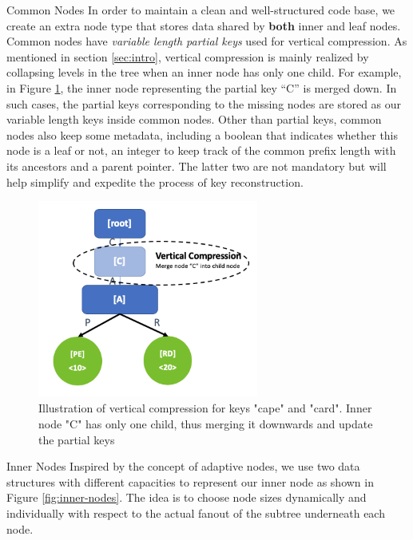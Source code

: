 \documentclass[sigplan,screen,nonacm]{acmart}
\makeatletter
\def\subsubsection{\@startsection{subsubsection}{3}%
  \z@{.5\linespacing\@plus.7\linespacing}{.1\linespacing}%
  {\normalfont\itshape}}
\makeatother
\begin{document}
\subsubsection{Common Nodes}
In order to maintain a clean and well-structured code base, we create an extra node type that stores data shared by \textbf{both} inner and leaf nodes. Common nodes have {\itshape variable length partial keys} used for vertical compression. As mentioned in section \ref{sec:intro}, vertical compression is mainly realized by collapsing levels in the tree when an inner node has only one child. For example, in Figure \ref{fig:vertical-compression}, the inner node representing the partial key “C” is merged down. In such cases, the partial keys corresponding to the missing nodes are stored as our variable length keys inside common nodes. Other than partial keys, common nodes also keep some metadata, including a boolean that indicates whether this node is a leaf or not, an integer to keep track of the common prefix length with its ancestors and a parent pointer. The latter two are not mandatory but will help simplify and expedite the process of key reconstruction. 
\begin{figure}[t]
  \centering
  \includegraphics[width=\linewidth, height=6.5cm]{pic/vertical compression.png}
  \setlength{\belowcaptionskip}{-10pt} 
  \caption{Illustration of vertical compression for keys "cape" and "card". Inner node "C" has only one child, thus merging it downwards and update the partial keys}
  \label{fig:vertical-compression}
\end{figure}

\subsubsection{Inner Nodes}
\label{sec:inner-nodes}
Inspired by the concept of adaptive nodes, we use two data structures with different capacities to represent our inner node as shown in Figure \ref{fig:inner-nodes}. The idea is to choose node sizes dynamically and individually with respect to the actual fanout of the subtree underneath each node. 
\end{document}
